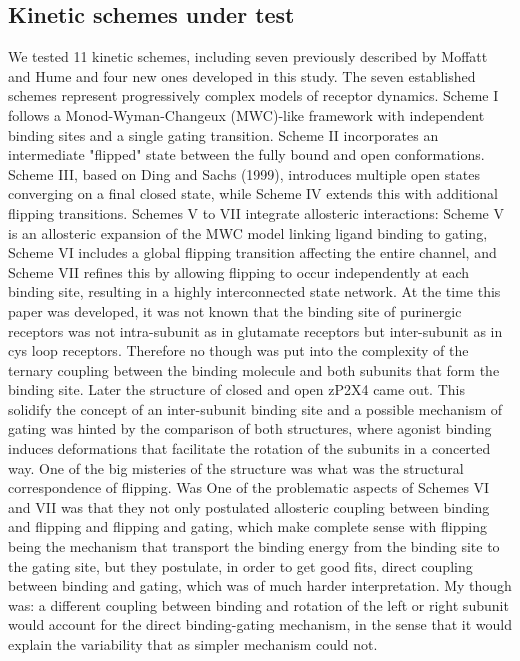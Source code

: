 \documentclass[pdflatex,sn-mathphys-num]{sn-jnl}%
\theoremstyle{thmstyleone}%
\theoremstyle{thmstyletwo}%
\theoremstyle{thmstylethree}%
\begin{document}
\subsection{Kinetic schemes under test}
We tested 11 kinetic schemes, including seven previously described by Moffatt and Hume and four new ones developed in this study. The seven established schemes represent progressively complex models of receptor dynamics. Scheme I follows a Monod-Wyman-Changeux (MWC)-like framework with independent binding sites and a single gating transition. Scheme II incorporates an intermediate "flipped" state between the fully bound and open conformations. Scheme III, based on Ding and Sachs (1999), introduces multiple open states converging on a final closed state, while Scheme IV extends this with additional flipping transitions. Schemes V to VII integrate allosteric interactions: Scheme V is an allosteric expansion of the MWC model linking ligand binding to gating, Scheme VI includes a global flipping transition affecting the entire channel, and Scheme VII refines this by allowing flipping to occur independently at each binding site, resulting in a highly interconnected state network. 
At the time this paper was developed, it was not known that the binding site of purinergic receptors was not intra-subunit as in glutamate receptors but inter-subunit as in cys loop receptors. Therefore no though was put into the complexity of the ternary coupling between the binding molecule and both subunits that form the binding site. 
Later the structure of closed and open zP2X4 came out. This solidify the concept of an inter-subunit binding site and a possible mechanism of gating was hinted by the comparison of both structures, where agonist binding induces deformations that facilitate the rotation of the subunits in a concerted way. 
One of the big misteries of the structure was what was the structural correspondence of flipping. Was 
One of the problematic aspects of Schemes VI and VII was that they not only postulated allosteric coupling between binding and flipping and flipping and gating, which make complete sense with flipping being the mechanism that transport the binding energy from the binding site to the gating site, but they postulate, in order to get good fits, direct coupling between binding and gating, which was of much harder interpretation. 
My though was: a different coupling between binding and rotation of the left or right subunit would account for the direct binding-gating mechanism, in the sense that it would explain the variability that as simpler mechanism could not. 
\end{document}
